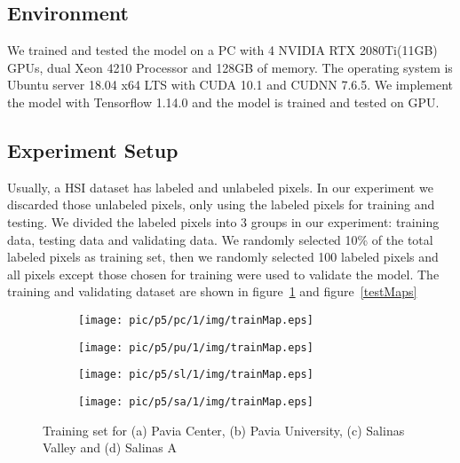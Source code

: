 \documentclass{article}
\begin{document}
	\subsection{Environment}\label{subsec:environment}
	We trained and tested the model on a PC with 4 NVIDIA RTX 2080Ti(11GB) GPUs, dual Xeon 4210 Processor
	and 128GB of memory.
	The operating system is Ubuntu server 18.04 x64 LTS with CUDA 10.1 and CUDNN 7.6.5.
	We implement the model with Tensorflow 1.14.0 and the model is trained and tested on GPU\@.

	\subsection{Experiment Setup}Usually, a HSI dataset has labeled and unlabeled pixels.
	In our experiment we discarded those unlabeled pixels, only using the labeled pixels for training and testing.
	We divided the labeled pixels into 3 groups in our experiment: training data, testing data and validating data.
	We randomly selected 10\% of the total labeled pixels as training set, then we randomly selected 100 labeled pixels
	and all pixels except those chosen for training were used to validate the model.
	The training and validating dataset are shown in figure~\ref{trainMaps} and figure~\ref{testMaps}

	\begin{figure}[htbp]
		\begin{subfigure}{0.24\textwidth}
			\texttt{[image: pic/p5/pc/1/img/trainMap.eps]}
			\caption{}
		\end{subfigure}
		\begin{subfigure}{0.24\textwidth}
			\texttt{[image: pic/p5/pu/1/img/trainMap.eps]}
			\caption{}
		\end{subfigure}
		\begin{subfigure}{0.24\textwidth}
			\texttt{[image: pic/p5/sl/1/img/trainMap.eps]}
			\caption{}
		\end{subfigure}
		\begin{subfigure}{0.24\textwidth}
			\texttt{[image: pic/p5/sa/1/img/trainMap.eps]}
			\caption{}
		\end{subfigure}
		\caption{Training set for (a) Pavia Center, (b) Pavia University, (c) Salinas Valley and (d) Salinas A}
		\label{trainMaps}
	\end{figure}
\end{document}
